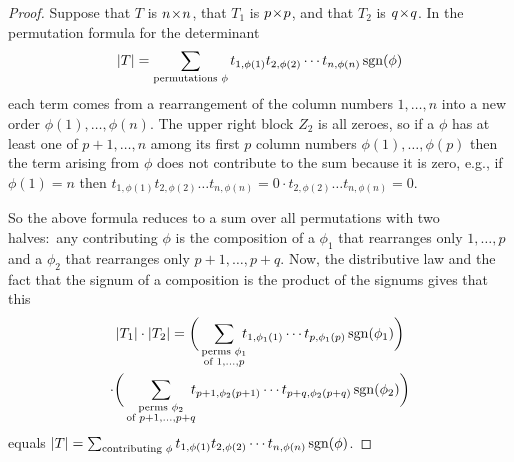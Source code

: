 \begin{proof}
Suppose that \( T \) is \( n \! \times \! n \),
that \( T_1 \) is \( p \! \times \! p \),
and that \( T_2 \) is \( q \! \times \! q \).
In the permutation formula for the determinant
\begin{equation*}
  \deter{T}=
  \sum_{\text{\scriptsize permutations\ }\phi}
          t_{1,\phi(1)}t_{2,\phi(2)}\cdots t_{n,\phi(n)}\sgn(\phi)
\end{equation*}
each term comes from a rearrangement of the column numbers
\( 1,\dots,n \) into a new order \( \phi(1),\dots,\phi(n) \).
The upper right block $Z_2$ is all zeroes, so if a
\( \phi \) has at least one of \( p+1,\dots,n \) among its first
\( p \) column numbers \( \phi(1),\dots,\phi(p) \) then the term arising
from \( \phi \) does not contribute to the sum because it is zero,
e.g., if \( \phi(1)=n \) then
\( t_{1,\phi(1)}t_{2,\phi(2)}\dots t_{n,\phi(n)}
   =0\cdot t_{2,\phi(2)}\dots t_{n,\phi(n)}=0 \).

So the above formula reduces to a sum over all permutations with 
two halves:~any contributing $\phi$ is the composition of a $\phi_1$ that
rearranges only \( 1,\dots,p \) 
and a $\phi_2$ that rearranges only \( p+1,\dots,p+q \).
Now, the distributive law 
and the fact that the signum of a composition is the product
of the signums gives that this
\begin{multline*}
   \deter{T_1}\cdot\deter{T_2}=
   \bigg(\sum_{\begin{subarray}{c}
                \text{\scriptsize perms\ }\phi_1 \\
                \text{\scriptsize of\ } 1,\dots,p
               \end{subarray}}
       \!\!\! t_{1,\phi_1(1)}\cdots t_{p,\phi_1(p)}\sgn(\phi_1) \bigg)  \\
   \cdot
   \bigg(\sum_{\begin{subarray}{c}
                \text{\scriptsize perms\ }\phi_2 \\
                \text{\scriptsize of\ } p+1,\dots,p+q
               \end{subarray}}
       \!\!\! t_{p+1,\phi_2(p+1)}\cdots t_{p+q,\phi_2(p+q)}\sgn(\phi_2) 
        \bigg)
\end{multline*}
equals
  $\deter{T}=
  \sum_{\text{\scriptsize contributing\ }\phi}
          t_{1,\phi(1)}t_{2,\phi(2)}\cdots t_{n,\phi(n)}\sgn(\phi)$.
\end{proof}

